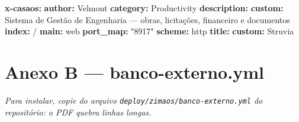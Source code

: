 \documentclass[
  10pt,
]{article}
\newenvironment{Shaded}{\begin{snugshade}}{\end{snugshade}}
\newcommand{\AttributeTok}[1]{\textcolor[rgb]{0.13,0.29,0.53}{#1}}
\newcommand{\FunctionTok}[1]{\textcolor[rgb]{0.13,0.29,0.53}{\textbf{#1}}}
\newcommand{\KeywordTok}[1]{\textcolor[rgb]{0.13,0.29,0.53}{\textbf{#1}}}
\newcommand{\StringTok}[1]{\textcolor[rgb]{0.31,0.60,0.02}{#1}}
\renewenvironment{quote}{\begin{oldquote}\small\itshape}{\end{oldquote}}
\begin{document}
\begin{Shaded}
\begin{Highlighting}[]
\FunctionTok{x{-}casaos}\KeywordTok{:}
\AttributeTok{  }\FunctionTok{author}\KeywordTok{:}\AttributeTok{ Velmont}
\AttributeTok{  }\FunctionTok{category}\KeywordTok{:}\AttributeTok{ Productivity}
\AttributeTok{  }\FunctionTok{description}\KeywordTok{:}
\AttributeTok{    }\FunctionTok{custom}\KeywordTok{:}\AttributeTok{ Sistema de Gestão de Engenharia — obras, licitações, financeiro e documentos}
\AttributeTok{  }\FunctionTok{index}\KeywordTok{:}\AttributeTok{ /}
\AttributeTok{  }\FunctionTok{main}\KeywordTok{:}\AttributeTok{ web}
\AttributeTok{  }\FunctionTok{port\_map}\KeywordTok{:}\AttributeTok{ }\StringTok{"8917"}
\AttributeTok{  }\FunctionTok{scheme}\KeywordTok{:}\AttributeTok{ http}
\AttributeTok{  }\FunctionTok{title}\KeywordTok{:}
\AttributeTok{    }\FunctionTok{custom}\KeywordTok{:}\AttributeTok{ Struvia}
\end{Highlighting}
\end{Shaded}

\hypertarget{anexo-b-banco-externo.yml}{%
\section{Anexo B ---
banco-externo.yml}\label{anexo-b-banco-externo.yml}}

\begin{quote}
Para instalar, copie do arquivo \texttt{deploy/zimaos/banco-externo.yml}
do repositório: o PDF quebra linhas longas.
\end{quote}
\end{document}
